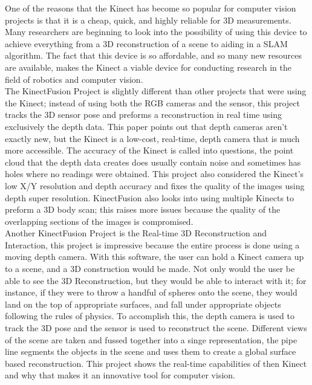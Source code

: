 \documentclass[12pt,twocolumn]{article}
\begin{document}
One of the reasons that the Kinect has become so popular for computer vision projects is that it is a cheap, quick, and highly reliable for 3D measurements. Many researchers are beginning to look into the possibility of using this device to achieve everything from a 3D reconstruction of a scene to aiding in a SLAM algorithm. The fact that this device is so affordable, and so many new resources are available, makes the Kinect a viable device for conducting research in the field of robotics and computer vision.\\
\indent The KinectFusion Project is slightly different than other projects that were using the Kinect; instead of using both the RGB cameras and the sensor, this project tracks the 3D sensor pose and preforms a reconstruction in real time using exclusively the depth data. This paper points out that depth cameras aren't exactly new, but the Kinect is a low-cost, real-time, depth camera that is much more accessible. The accuracy of the Kinect is called into questions, the point cloud that the depth data creates does usually contain noise and sometimes has holes where no readings were obtained. This project also considered the Kinect's low X/Y resolution and depth accuracy and fixes the quality of the images using depth super resolution. KinectFusion also looks into using multiple Kinects to preform a 3D body scan; this raises more issues because the quality of the overlapping sections of the images is compromised. \\
\indent	Another KinectFusion Project is the Real-time 3D Reconstruction and Interaction, this project is impressive because the entire process is done using a moving depth camera. With this software, the user can hold a Kinect camera up to a scene, and a 3D construction would be made. Not only would the user be able to see the 3D Reconstruction, but they would be able to interact with it; for instance, if they were to throw a handful of spheres onto the scene, they would land on the top of appropriate surfaces, and fall under appropriate objects following the rules of physics. To accomplish this, the depth camera is used to track the 3D pose and the sensor is used to reconstruct the scene. Different views of the scene are taken and fussed together into a singe representation, the pipe line segments the objects in the scene and uses them to create a global surface based reconstruction. This project shows the real-time capabilities of then Kinect and why that makes it an innovative tool for computer vision.\\
\end{document}
